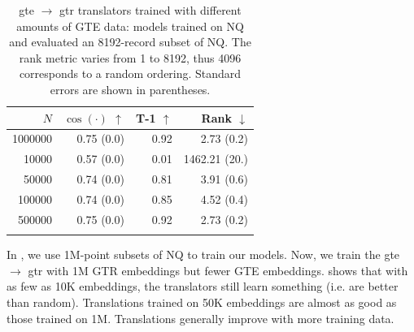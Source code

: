 \begin{table}[!ht]
    \scriptsize
    \centering
    \begin{tabular}{rrrr}
        \toprule
        $N$ & $\cos(\cdot)$ $\uparrow$ & T-1 $\uparrow$ & Rank $\downarrow$ \\
        \midrule
        1000000&0.75 {\scriptsize (0.0)} & 0.92 & 2.73 {\scriptsize (0.2)}\\
        \midrule
        10000 & 0.57 {\scriptsize (0.0)} & 0.01 & 1462.21 {\scriptsize (20.)}\\
        50000 & 0.74 {\scriptsize (0.0)} & 0.81 & 3.91 {\scriptsize (0.6)}\\
        100000  & 0.74 {\scriptsize (0.0)} & 0.85 &  4.52 {\scriptsize (0.4)}\\
        500000 & 0.75 {\scriptsize (0.0)} & 0.92 &  2.73 {\scriptsize (0.2)}\\
        \bottomrule\\[-1.6ex]
    \end{tabular}
    \caption{gte $\to$ gtr translators trained with different amounts of GTE data: \atk{} models trained on NQ and evaluated an 8192-record subset of NQ. The rank metric varies from 1 to 8192, thus 4096 corresponds to a random ordering. Standard errors are shown in parentheses.}
    \label{tab:n_data}
\end{table}

 In , we use 1M-point subsets of NQ to train our \atk{} models. Now, we train the gte $\to$ gtr \atk{} with 1M GTR embeddings but fewer GTE embeddings.  shows that with as few as 10K embeddings, the translators still learn something (i.e. are better than random). Translations trained on 50K embeddings are almost as good as those trained on 1M. Translations generally improve with more training data.
